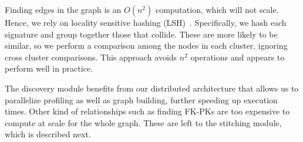 Finding edges in the graph is an $O(n^2)$ computation, which will not scale.  Hence, we rely on locality sensitive hashing (LSH)~\cite{DBLP:conf/compgeom/DatarIIM04}. Specifically, we hash each signature and group together those that collide.  These are more likely to be similar, so we perform a comparison among the nodes in each cluster, ignoring cross cluster comparisons.  This approach avoids $n^2$ operations and appears to perform well in practice.


The discovery module benefits from our distributed architecture that allows us to parallelize profiling as well as graph building, further speeding up execution times. Other kind of relationships such as finding FK-PKs are too expensive to compute at scale for the whole graph.  These are left to the stitching module, which is described next. 


